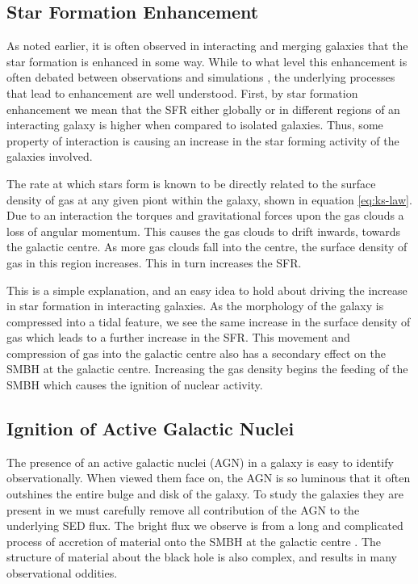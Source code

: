 \subsection{Star Formation Enhancement} 
\noindent As noted earlier, it is often observed in interacting and merging galaxies that the star formation is enhanced in some way. While to what level this enhancement is often debated between observations \citep{2003ApJ...582..668B, 2008MNRAS.385.1903L, 2011MNRAS.412..591P, 2022ApJS..261...34H} and simulations \citep{2007A&A...468...61D, 2008MNRAS.384..386C, 2013MNRAS.430.1901H, 2021MNRAS.503.3113M}, the underlying processes that lead to enhancement are well understood. First, by star formation enhancement we mean that the SFR either globally or in different regions of an interacting galaxy is higher when compared to isolated galaxies. Thus, some property of interaction is causing an increase in the star forming activity of the galaxies involved. 

The rate at which stars form is known to be directly related to the surface density of gas at any given piont within the galaxy, shown in equation \ref{eq:ks-law}. Due to an interaction the torques and gravitational forces upon the gas clouds a loss of angular momentum. This causes the gas clouds to drift inwards, towards the galactic centre. As more gas clouds fall into the centre, the surface density of gas in this region increases. This in turn increases the SFR.

This is a simple explanation, and an easy idea to hold about driving the increase in star formation in interacting galaxies. As the morphology of the galaxy is compressed into a tidal feature, we see the same increase in the surface density of gas which leads to a further increase in the SFR. This movement and compression of gas into the galactic centre also has a secondary effect on the SMBH at the galactic centre. Increasing the gas density begins the feeding of the SMBH which causes the ignition of nuclear activity.

\subsection{Ignition of Active Galactic Nuclei}
\noindent The presence of an active galactic nuclei (AGN) in a galaxy is easy to identify observationally. When viewed them face on, the AGN is so luminous that it often outshines the entire bulge and disk of the galaxy. To study the galaxies they are present in we must carefully remove all contribution of the AGN to the underlying SED flux. The bright flux we observe is from a long and complicated process of accretion of material onto the SMBH at the galactic centre \citep[for an excellent breakdown of the structure and evolution of AGN see][]{2012agn..book.....B}. The structure of material about the black hole is also complex, and results in many observational oddities. 

